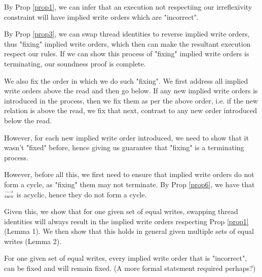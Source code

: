         By Prop \ref{prop1}, we can infer that an execution not respectiing our irreflexivity constraint will have implied write orders which are "incorrect". 

        
        By Prop \ref{prop3}, we can swap thread identities to reverse implied write orders, thus "fixing" implied write orders, which then can make the resultant execution respect our rules. If we can show this process of "fixing" implied write orders is terminating, our soundness proof is complete. 

        We also fix the order in which we do such "fixing". We first address all implied write orders above the read and then go below. 
        If any new implied write orders is introduced in the process, then we fix them as per the above order, i.e. if the new relation is above the read, we fix that next, contrast to any new order introduced below the read. 
        
        However, for each new implied write order introduced, we need to show that it wasn't "fixed" before, hence giving us guarantee that "fixing" is a terminating process. 
        
        However, before all this, we first need to ensure that implied write orders do not form a cycle, as "fixing" them may not terminate.  By Prop \ref{prop6}, we have that $\stackrel{\longrightarrow}{_{iwo}}$ is acyclic, hence they do not form a cycle.  
        
        Given this, we show that for one given set of equal writes, swapping thread identities will always result in the implied write orders respecting Prop \ref{prop1} (Lemma 1). 
        We then show that this holds in general given multiple sets of equal writes (Lemma 2).  



        \begin{lemma}
            For one given set of equal writes, every implied write order that is "incorrect", can be fixed and will remain fixed.  
            (A more formal statement required perhaps?)
        \end{lemma}
            
